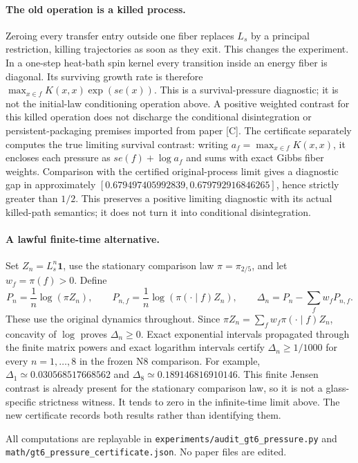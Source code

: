 \documentclass{article}
\begin{document}
\paragraph{The old operation is a killed process.}
Zeroing every transfer entry outside one fiber replaces $L_s$ by a principal
restriction, killing trajectories as soon as they exit. This changes the
experiment. In a one-step heat-bath spin kernel every transition inside an
energy fiber is diagonal. Its surviving growth rate is therefore
$\max_{x\in f}K(x,x)\exp(se(x))$. This is a survival-pressure diagnostic;
it is not the initial-law conditioning operation above. A positive weighted
contrast for this killed operation does not discharge the conditional
disintegration or persistent-packaging premises imported from paper [C].
The certificate separately computes the true limiting survival contrast:
writing $a_f=\max_{x\in f}K(x,x)$, it encloses each pressure as
$se(f)+\log a_f$ and sums with exact Gibbs fiber weights. Comparison with
the certified original-process limit gives a diagnostic gap in approximately
$[0.679497405992839,0.679792916846265]$, hence strictly greater than $1/2$.
This preserves a positive limiting diagnostic with its actual killed-path
semantics; it does not turn it into conditional disintegration.

\paragraph{A lawful finite-time alternative.}
Set $Z_n=L_s^n\mathbf1$, use the stationary comparison law $\pi=\pi_{2/5}$,
and let $w_f=\pi(f)>0$. Define
\[
 P_n=\frac1n\log(\pi Z_n),\qquad
 P_{n,f}=\frac1n\log(\pi(\cdot\mid f)Z_n),\qquad
 \Delta_n=P_n-\sum_f w_fP_{n,f}.
\]
These use the original dynamics throughout. Since
$\pi Z_n=\sum_fw_f\pi(\cdot\mid f)Z_n$, concavity of $\log$ proves
$\Delta_n\geq0$. Exact exponential intervals propagated through the finite
matrix powers and exact logarithm intervals certify
$\Delta_n\geq1/1000$ for every $n=1,\ldots,8$ in the frozen N8 comparison.
For example, $\Delta_1\simeq0.030568517668562$ and
$\Delta_8\simeq0.189146816910146$. This finite Jensen contrast is already
present for the stationary comparison law, so it is not a glass-specific
strictness witness. It tends to zero in the infinite-time limit above.
The new certificate records both results rather than identifying them.

All computations are replayable in
\texttt{experiments/audit\_gt6\_pressure.py} and
\texttt{math/gt6\_pressure\_certificate.json}. No paper files are edited.
\end{document}
